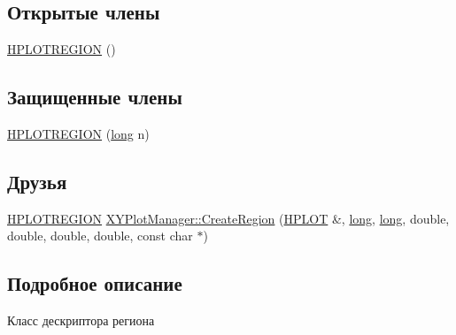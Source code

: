 \subsection*{Открытые члены}
\begin{DoxyCompactItemize}
\item 
\hyperlink{classxyplot_1_1_h_p_l_o_t_r_e_g_i_o_n_a677cb699a43af8287c064a13c6da2657}{H\-P\-L\-O\-T\-R\-E\-G\-I\-O\-N} ()
\end{DoxyCompactItemize}
\subsection*{Защищенные члены}
\begin{DoxyCompactItemize}
\item 
\hyperlink{classxyplot_1_1_h_p_l_o_t_r_e_g_i_o_n_a78bccc9ad3433621e0447d0943a3583e}{H\-P\-L\-O\-T\-R\-E\-G\-I\-O\-N} (\hyperlink{namespacexyplot_a27bc71b0bdfac09495e7e531d8a918c5}{long} n)
\end{DoxyCompactItemize}
\subsection*{Друзья}
\begin{DoxyCompactItemize}
\item 
\hyperlink{classxyplot_1_1_h_p_l_o_t_r_e_g_i_o_n}{H\-P\-L\-O\-T\-R\-E\-G\-I\-O\-N} \hyperlink{classxyplot_1_1_h_p_l_o_t_r_e_g_i_o_n_afa1601e2b07b76f8076693c7f921e24f}{X\-Y\-Plot\-Manager\-::\-Create\-Region} (\hyperlink{classxyplot_1_1_h_p_l_o_t}{H\-P\-L\-O\-T} \&, \hyperlink{namespacexyplot_a27bc71b0bdfac09495e7e531d8a918c5}{long}, \hyperlink{namespacexyplot_a27bc71b0bdfac09495e7e531d8a918c5}{long}, double, double, double, double, const char $\ast$)
\end{DoxyCompactItemize}


\subsection{Подробное описание}
Класс дескриптора региона 

